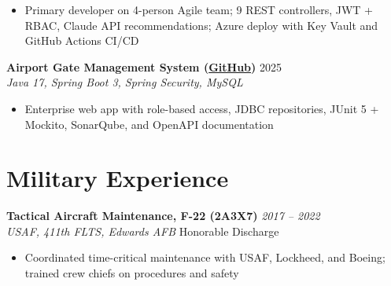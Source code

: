 \documentclass[10pt,letterpaper]{article}
\newcommand{\resumeHeading}[4]{
  \vspace{0pt}
  \textbf{#1} \hfill \textit{#2} \\
  \textit{#3} \hfill #4
}
\newcommand{\projectHeading}[3]{
  \vspace{0pt}
  \textbf{#1} \hfill #2 \\
  \textit{#3}
}
\begin{document}
\begin{itemize}
  \item Primary developer on 4-person Agile team; 9 REST controllers, JWT + RBAC, Claude API recommendations; Azure deploy with Key Vault and GitHub Actions CI/CD
\end{itemize}
\projectHeading{Airport Gate Management System \textnormal{(\href{https://github.com/omniV1/GCU_SWE_2023-2025/tree/main/CST-339-Java3/workspaceCST-339/src/Milestone/agms}{GitHub})}}{2025}{Java 17, Spring Boot 3, Spring Security, MySQL}
\begin{itemize}
  \item Enterprise web app with role-based access, JDBC repositories, JUnit 5 + Mockito, SonarQube, and OpenAPI documentation
\end{itemize}

\section{Military Experience}
\resumeHeading{Tactical Aircraft Maintenance, F-22 (2A3X7)}{2017 -- 2022}{USAF, 411th FLTS, Edwards AFB}{Honorable Discharge}
\begin{itemize}
  \item Coordinated time-critical maintenance with USAF, Lockheed, and Boeing; trained crew chiefs on procedures and safety
\end{itemize}
\end{document}
